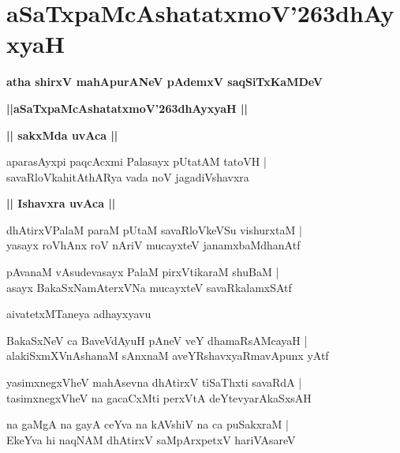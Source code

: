 \documentclass[twoside,12pt,openright]{book}
\def\S{\char'263}
\newcounter{shloka}[chapter]
\def\uvaca#1{\centerline{{\large\textbf{#1}}}}
\begin{document}
\chapter{aSaTxpaMcAshatatxmoV\S dhAyxyaH}

\begin{center}
{\LARGE\bfseries atha shirxV mahApurANeV pAdemxV saqSiTxKaMDeV}
\end{center}

\begin{center}
{\LARGE\bfseries ||aSaTxpaMcAshatatxmoV\S dhAyxyaH || }
\end{center}

\uvaca{|| sakxMda uvAca ||}

\begin{shloka}%
aparasAyxpi paqcAcxmi Palasayx pUtatAM tatoVH |\\
savaRloVkahitAthARya vada noV jagadiVshavxra
\end{shloka}

\uvaca{|| Ishavxra uvAca ||}

\begin{shloka}%
dhAtirxVPalaM paraM pUtaM savaRloVkeVSu vishurxtaM |\\
yasayx roVhAnx roV nAriV mucayxteV janamxbaMdhanAtf
\end{shloka}

\begin{shloka}%
pAvanaM vAsudevasayx PalaM pirxVtikaraM shuBaM |\\
asayx BakaSxNamAterxVNa mucayxteV savaRkalamxSAtf
\end{shloka}

\begin{center}
aivatetxMTaneya adhayxyavu
\end{center}

\begin{shloka}%
BakaSxNeV ca BaveVdAyuH pAneV veY dhamaRsAMcayaH |\\
alakiSxmXVnAshanaM sAnxnaM aveYRshavxyaRmavApunx yAtf 
\end{shloka}

\begin{shloka}%
yasimxnegxVheV mahAsevna dhAtirxV tiSaThxti savaRdA |\\
tasimxnegxVheV na gacaCxMti perxVtA deYtevyarAkaSxsAH 
\end{shloka}

\begin{shloka}%
na gaMgA na gayA ceYva na kAVshiV na ca puSakxraM |\\
EkeYva hi naqNAM dhAtirxV saMpArxpetxV hariVAsareV 
\end{shloka}
\end{document}
